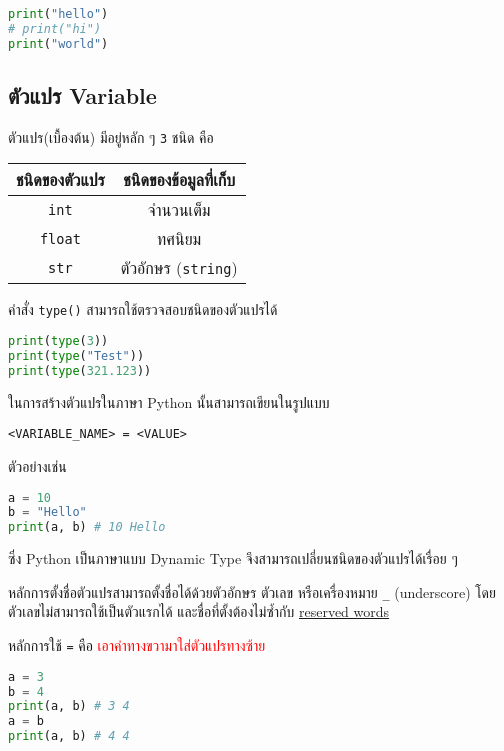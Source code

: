 \begin{lstlisting}[language=Python]
print("hello")
# print("hi")
print("world")
\end{lstlisting}

\subsection{ตัวแปร Variable}

ตัวแปร(เบื้องต้น) มีอยู่หลัก ๆ \verb|3| ชนิด คือ

\begin{center}
    \begin{tabular}{|c|c|}
        \hline
        ชนิดของตัวแปร & ชนิดของข้อมูลที่เก็บ\\
        \hline
        \verb|int| & จำนวนเต็ม\\
        \verb|float| & ทศนิยม\\
        \verb|str| & ตัวอักษร (\verb|string|)\\
        \hline
    \end{tabular}
\end{center}

คำสั่ง \verb|type()| สามารถใช้ตรวจสอบชนิดของตัวแปรได้

\begin{lstlisting}[language=Python]
print(type(3))
print(type("Test"))
print(type(321.123))
\end{lstlisting}

ในการสร้างตัวแปรในภาษา Python นั้นสามารถเขียนในรูปแบบ

\begin{verbatim}
<VARIABLE_NAME> = <VALUE>
\end{verbatim}

ตัวอย่างเช่น

\begin{lstlisting}[language=Python]
a = 10
b = "Hello"
print(a, b) # 10 Hello
\end{lstlisting}

ซึ่ง Python เป็นภาษาแบบ Dynamic Type จึงสามารถเปลี่ยนชนิดของตัวแปรได้เรื่อย ๆ

หลักการตั้งชื่อตัวแปรสามารถตั้งชื่อได้ด้วยตัวอักษร ตัวเลข หรือเครื่องหมาย \verb|_| (underscore) โดยตัวเลขไม่สามารถใช้เป็นตัวแรกได้ และชื่อที่ตั้งต้องไม่ซ้ำกับ \href{https://www.w3schools.com/python/python_ref_keywords.asp}{reserved words}

หลักการใช้ \verb|=| คือ \textcolor{red}{เอาค่าทางขวามาใส่ตัวแปรทางซ้าย}

\begin{lstlisting}[language=Python]
a = 3
b = 4
print(a, b) # 3 4
a = b
print(a, b) # 4 4 
\end{lstlisting}

